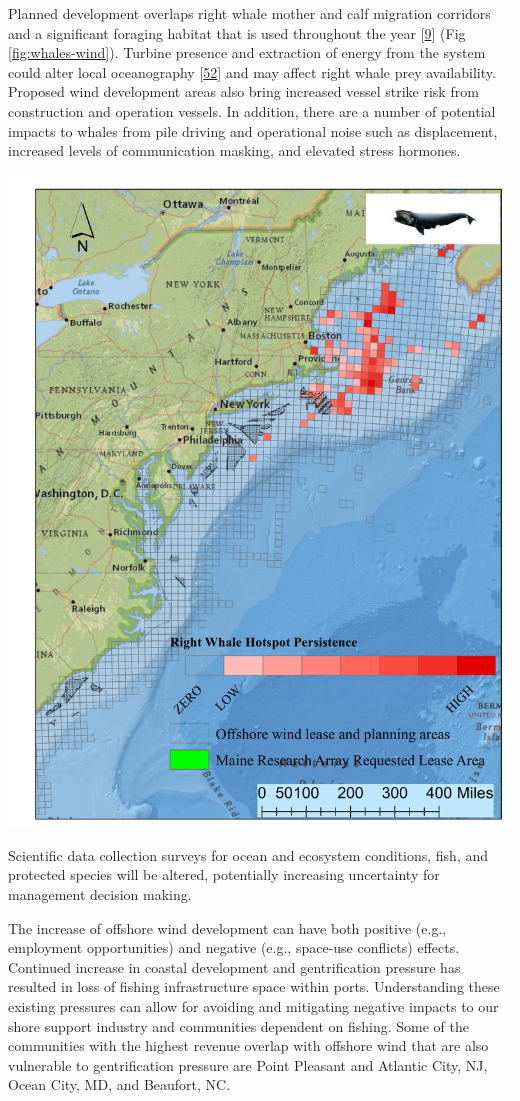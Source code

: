 \documentclass[
  10pt,
]{article}
\let\origfigure\figure
\let\endorigfigure\endfigure
\renewenvironment{figure}[1][2] {
    \expandafter\origfigure\expandafter[H]
} {
    \endorigfigure
}
\begin{document}
Planned development overlaps right whale mother and calf migration
corridors and a significant foraging habitat that is used throughout the
year {[}\protect\hyperlink{ref-quintana-rizzo_residency_2021}{9}{]} (Fig
\ref{fig:whales-wind}). Turbine presence and extraction of energy from
the system could alter local oceanography
{[}\protect\hyperlink{ref-christiansen_emergence_2022}{52}{]} and may
affect right whale prey availability. Proposed wind development areas
also bring increased vessel strike risk from construction and operation
vessels. In addition, there are a number of potential impacts to whales
from pile driving and operational noise such as displacement, increased
levels of communication masking, and elevated stress hormones.

\begin{figure}

{\centering \includegraphics[width=0.6\linewidth]{images/NARW_hotpsot_persistence_2_1_2022_TPW} 

}

\caption{Northern Right Whale persistent hotspots and Wind Energy Areas.}\label{fig:whales-wind}
\end{figure}

Scientific data collection surveys for ocean and ecosystem conditions,
fish, and protected species will be altered, potentially increasing
uncertainty for management decision making.

The increase of offshore wind development can have both positive (e.g.,
employment opportunities) and negative (e.g., space-use conflicts)
effects. Continued increase in coastal development and gentrification
pressure has resulted in loss of fishing infrastructure space within
ports. Understanding these existing pressures can allow for avoiding and
mitigating negative impacts to our shore support industry and
communities dependent on fishing. Some of the communities with the
highest revenue overlap with offshore wind that are also vulnerable to
gentrification pressure are Point Pleasant and Atlantic City, NJ, Ocean
City, MD, and Beaufort, NC.
\end{document}
